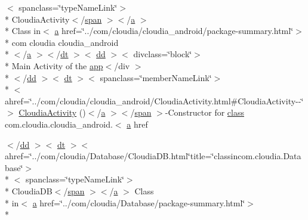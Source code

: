\begin{DoxyCompactItemize}
$<$ spanclass=\char`\"{}type\-Name\-Link\char`\"{}$>$\\*
 Cloudia\-Activity$<$/\hyperlink{stylesheet_8css_a8343996ebcf16220b04e54659aac31cc}{span} $>$$<$/\hyperlink{style_8css_a5e8981582017bb8b84c21f148345d1f7}{a} $>$\\*
 Class in$<$ \hyperlink{style_8css_a5e8981582017bb8b84c21f148345d1f7}{a} href=\char`\"{}../com/cloudia/cloudia\-\_\-android/package-\/summary.\-html\char`\"{}$>$\\*
 com cloudia cloudia\-\_\-android\\*
$<$/\hyperlink{style_8css_a5e8981582017bb8b84c21f148345d1f7}{a} $>$$<$/\hyperlink{stylesheet_8css_a107565fb4039d33b041380d6e0ea1d80}{dt} $>$$<$ \hyperlink{stylesheet_8css_a47f4718a86835a7771ec592ece845221}{dd} $>$$<$ divclass=\char`\"{}block\char`\"{}$>$\\*
 Main Activity of the \hyperlink{index_8js_a7b225fcb720e4d5ed2bbf60e28a25e6d}{app}$<$/div $>$\\*
$<$/\hyperlink{stylesheet_8css_a47f4718a86835a7771ec592ece845221}{dd} $>$$<$ \hyperlink{stylesheet_8css_a107565fb4039d33b041380d6e0ea1d80}{dt} $>$$<$ spanclass=\char`\"{}member\-Name\-Link\char`\"{}$>$\\*
$<$ ahref=\char`\"{}../com/cloudia/cloudia\-\_\-android/Cloudia\-Activity.\-html\#Cloudia\-Activity-\/-\/\char`\"{}$>$ \hyperlink{index-3_8html_a0e285ff6d65a8c927bda571480243ac7}{Cloudia\-Activity} ()$<$/\hyperlink{style_8css_a5e8981582017bb8b84c21f148345d1f7}{a} $>$$<$/\hyperlink{stylesheet_8css_a8343996ebcf16220b04e54659aac31cc}{span} $>$-\/Constructor for \hyperlink{_tools_8html_acf06f836132665ba8114f5a414c2403f}{class} com.\-cloudia.\-cloudia\-\_\-android.$<$ \hyperlink{style_8css_a5e8981582017bb8b84c21f148345d1f7}{a} href
\item 
$<$/\hyperlink{stylesheet_8css_a47f4718a86835a7771ec592ece845221}{dd} $>$$<$ \hyperlink{stylesheet_8css_a107565fb4039d33b041380d6e0ea1d80}{dt} $>$$<$ ahref=\char`\"{}../com/cloudia/Database/Cloudia\-D\-B.\-html\char`\"{}title=\char`\"{}classincom.\-cloudia.\-Database\char`\"{}$>$\\*
$<$ spanclass=\char`\"{}type\-Name\-Link\char`\"{}$>$\\*
 Cloudia\-D\-B$<$/\hyperlink{stylesheet_8css_a8343996ebcf16220b04e54659aac31cc}{span} $>$$<$/\hyperlink{style_8css_a5e8981582017bb8b84c21f148345d1f7}{a} $>$ Class \\*
in$<$ \hyperlink{style_8css_a5e8981582017bb8b84c21f148345d1f7}{a} href=\char`\"{}../com/cloudia/Database/package-\/summary.\-html\char`\"{}$>$\\*

\end{DoxyCompactItemize}
